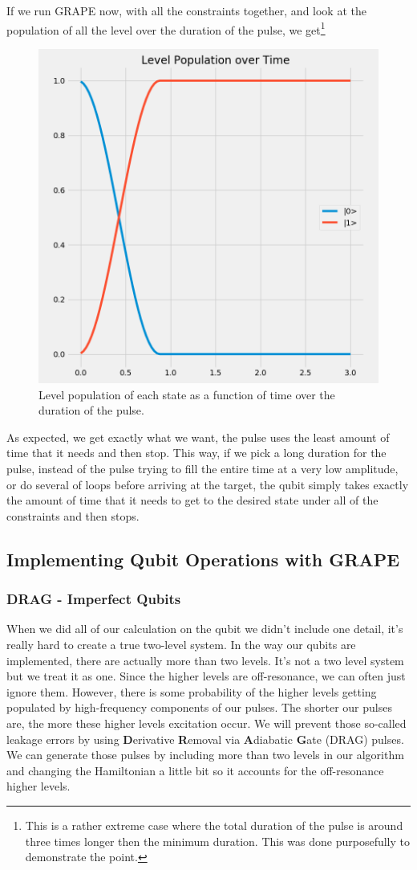 If we run GRAPE now, with all the constraints together, and look at the population of all the level over the duration of the pulse, we get\footnote{This is a rather extreme case where the total duration of the pulse is around three times longer then the minimum duration. This was done purposefully to demonstrate the point.}
\begin{figure}[H]
    \centering
    \includegraphics[width=0.5\columnwidth]{Results/duration-constraint/level-population.png}
    \caption{Level population of each state as a function of time over the duration of the pulse.}
    \label{fig:dur-penelty}
\end{figure}

As expected, we get exactly what we want, the pulse uses the least amount of time that it needs and then stop. This way, if we pick a long duration for the pulse, instead of the pulse trying to fill the entire time at a very low amplitude, or do several of loops before arriving at the target, the qubit simply takes exactly the amount of time that it needs to get to the desired state under all of the constraints and then stops.

\subsection{Implementing Qubit Operations with GRAPE}

\subsubsection{DRAG - Imperfect Qubits} \label{sec:DRAG}
When we did all of our calculation on the qubit we didn't include one detail, it's really hard to create a true two-level system. In the way our qubits are implemented, there are actually more than two levels. It's not a two level system but we treat it as one. Since the higher levels are off-resonance, we can often just ignore them. However, there is some probability of the higher levels getting populated by high-frequency components of our pulses. The shorter our pulses are, the more these higher  levels excitation occur. We will prevent those so-called leakage errors by using \textbf{D}erivative \textbf{R}emoval via \textbf{A}diabatic \textbf{G}ate (DRAG) pulses. We can generate those pulses by including more than two levels in our algorithm and changing the Hamiltonian a little bit so it accounts for the off-resonance higher levels.

